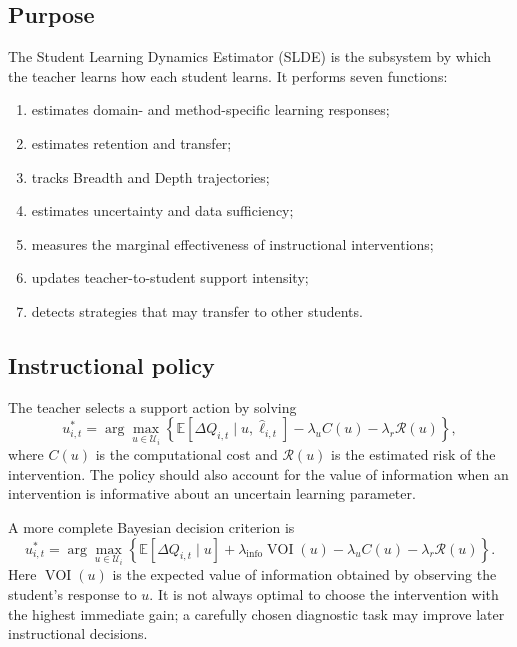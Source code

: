 \documentclass[11pt,a4paper]{article}
\begin{document}
\subsection{Purpose}

The Student Learning Dynamics Estimator (SLDE) is the subsystem by which the teacher learns how each student learns. It performs seven functions:
\begin{enumerate}
\item estimates domain- and method-specific learning responses;
\item estimates retention and transfer;
\item tracks Breadth and Depth trajectories;
\item estimates uncertainty and data sufficiency;
\item measures the marginal effectiveness of instructional interventions;
\item updates teacher-to-student support intensity;
\item detects strategies that may transfer to other students.
\end{enumerate}

\subsection{Instructional policy}

The teacher selects a support action by solving
\begin{equation}
u_{i,t}^{*}
=
\arg\max_{u\in\mathcal U_i}
\left\{
\mathbb E[\Delta Q_{i,t}\mid u,\widehat{\boldsymbol{\ell}}_{i,t}]
-\lambda_u C(u)
-\lambda_r\mathcal R(u)
\right\},
\end{equation}
where \(C(u)\) is the computational cost and \(\mathcal R(u)\) is the estimated risk of the intervention. The policy should also account for the value of information when an intervention is informative about an uncertain learning parameter.

A more complete Bayesian decision criterion is
\begin{equation}
u_{i,t}^{*}
=
\arg\max_{u\in\mathcal U_i}
\left\{
\mathbb E[\Delta Q_{i,t}\mid u]
+\lambda_{\mathrm{info}}\operatorname{VOI}(u)
-\lambda_u C(u)
-\lambda_r\mathcal R(u)
\right\}.
\end{equation}
Here \(\operatorname{VOI}(u)\) is the expected value of information obtained by observing the student's response to \(u\). It is not always optimal to choose the intervention with the highest immediate gain; a carefully chosen diagnostic task may improve later instructional decisions.
\end{document}
